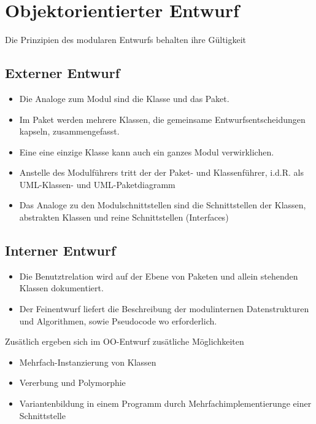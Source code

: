 \section{Objektorientierter Entwurf}

Die Prinzipien des modularen Entwurfs behalten ihre Gültigkeit

\subsection{Externer Entwurf}
\begin{itemize}
    \item Die Analoge zum Modul sind die Klasse und das Paket.
    \item Im Paket werden mehrere Klassen, die gemeinsame Entwurfsentscheidungen kapseln, zusammengefasst.
    \item Eine eine einzige Klasse kann auch ein ganzes Modul verwirklichen.
    \item Anstelle des Modulführers tritt der der Paket- und Klassenführer, i.d.R. als UML-Klassen- und UML-Paketdiagramm
    \item Das Analoge zu den Modulschnittstellen sind die Schnittstellen der Klassen, abstrakten Klassen und reine Schnittstellen (Interfaces)
\end{itemize}

\subsection{Interner Entwurf}
\begin{itemize}
    \item Die Benutztrelation wird auf der Ebene von Paketen und allein stehenden Klassen dokumentiert.
    \item Der Feinentwurf liefert die Beschreibung der modulinternen Datenstrukturen und Algorithmen, sowie Pseudocode wo erforderlich.
\end{itemize}

Zusätlich ergeben sich im OO-Entwurf zusätliche Möglichkeiten
\begin{itemize}
    \item Mehrfach-Instanzierung von Klassen
    \item Vererbung und Polymorphie
    \item Variantenbildung in einem Programm durch Mehrfachimplementierunge einer Schnittstelle
\end{itemize}